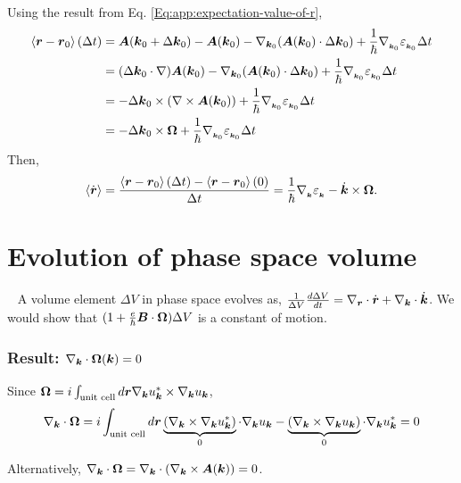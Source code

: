 \documentclass{report}
\renewcommand\vec[1]{\ensuremath\boldsymbol{#1}} %
\begin{document}
Using the result from Eq. \eqref{Eq:app:expectation-value-of-r},
$$
\begin{aligned}
\expval{\vec{r} - \vec{r}_0}(\Delta t) &= \vec{A}(\vec{k}_0 + \Delta \vec{k}_0) - \vec{A}(\vec{k}_0) - \nabla_{\vec{k}_0}(\vec{A}(\vec{k}_0)\cdot \Delta \vec{k}_0) + \frac{1}{\hbar} \nabla_{_{\vec{k}_0}} \varepsilon_{_{\vec{k}_0}} \Delta t \\
&= (\Delta \vec{k}_0 \cdot \nabla) \vec{A}(\vec{k}_0) - \nabla_{\vec{k}_0}(\vec{A}(\vec{k}_0)\cdot \Delta \vec{k}_0) + \frac{1}{\hbar} \nabla_{_{\vec{k}_0}} \varepsilon_{_{\vec{k}_0}} \Delta t \\
&= -\Delta \vec{k}_0 \times (\nabla \times \vec{A}(\vec{k}_0)) + \frac{1}{\hbar} \nabla_{_{\vec{k}_0}} \varepsilon_{_{\vec{k}_0}} \Delta t \\
&= -\Delta \vec{k}_0 \times \vec{\Omega} + \frac{1}{\hbar} \nabla_{_{\vec{k}_0}} \varepsilon_{_{\vec{k}_0}} \Delta t \\
\end{aligned}
$$
Then, $$\expval{\dot{\vec{r}}} = \frac{\expval{\vec{r} - \vec{r}_0}(\Delta t) - \expval{\vec{r} - \vec{r}_0}(0)}{\Delta t} = \frac{1}{\hbar} \nabla_{_{\vec{k}}} \varepsilon_{_{\vec{k}}} -\dot{\vec{k}} \times \vec{\Omega} .$$
\chapter{Evolution of phase space volume}~\label{app:phase-space-volume-evolution}
A volume element $\Delta V$ in phase space evolves as, $\frac{1}{\Delta V} \frac{d \Delta V}{dt} = \nabla_{\vec{r}}\cdot \dot{\vec{r}} + \nabla_{\vec{k}}\cdot \dot{\vec{k}}$.
We would show that $(1 + \frac{e}{\hbar} \vec{B}\cdot \vec{\Omega}) \Delta V$ is a constant of motion.

\subsection{Result: $\nabla_{\vec{k}} \cdot \vec{\Omega}(\vec{k}) = 0$}
Since $\vec{\Omega} = i \int_{\text{unit cell}} d\vec{r} \nabla_{\vec{k}} u_{\vec{k}}^* \times \nabla_{\vec{k}} u_{\vec{k}}$, 
$$\nabla_{\vec{k}} \cdot \vec{\Omega} = i \int_{\text{unit cell}} d\vec{r} \underbrace{(\nabla_{\vec{k}} \times \nabla_{\vec{k}} u_{\vec{k}}^*)}_0 \cdot \nabla_{\vec{k}} u_{\vec{k}} - \underbrace{(\nabla_{\vec{k}} \times \nabla_{\vec{k}} u_{\vec{k}})}_0 \cdot \nabla_{\vec{k}} u_{\vec{k}}^* = 0$$

Alternatively, $\nabla_{\vec{k}} \cdot \vec{\Omega} = \nabla_{\vec{k}} \cdot \left(\nabla_{\vec{k}} \times \vec{A} (\vec{k})\right) =0$.
\end{document}
